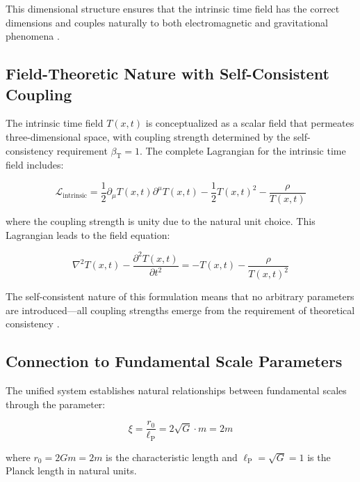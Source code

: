 \documentclass[12pt,a4paper]{article}
\newcommand{\Tfieldt}{T(x,t)}
\newcommand{\betaT}{\beta_{\text{T}}}
\newcommand{\lP}{\ell_{\text{P}}}
\newcommand{\xipar}{\xi}
\begin{document}
	This dimensional structure ensures that the intrinsic time field has the correct dimensions and couples naturally to both electromagnetic and gravitational phenomena \cite{pascher_lagrangian_2025}.
	
	\subsection{Field-Theoretic Nature with Self-Consistent Coupling}
	\label{subsec:field_theoretic_self_consistent}
	
	The intrinsic time field $\Tfieldt$ is conceptualized as a scalar field that permeates three-dimensional space, with coupling strength determined by the self-consistency requirement $\betaT = 1$. The complete Lagrangian for the intrinsic time field includes:
	
	\begin{equation}
		\mathcal{L}_{\text{intrinsic}} = \frac{1}{2} \partial_\mu \Tfieldt \partial^\mu \Tfieldt - \frac{1}{2}\Tfieldt^2 - \frac{\rho}{\Tfieldt}
	\end{equation}
	
	where the coupling strength is unity due to the natural unit choice. This Lagrangian leads to the field equation:
	
	\begin{equation}
		\nabla^2 \Tfieldt - \frac{\partial^2 \Tfieldt}{\partial t^2} = -\Tfieldt - \frac{\rho}{\Tfieldt^2}
	\end{equation}
	
	The self-consistent nature of this formulation means that no arbitrary parameters are introduced—all coupling strengths emerge from the requirement of theoretical consistency \cite{pascher_unified_2025}.
	
	\subsection{Connection to Fundamental Scale Parameters}
	\label{subsec:fundamental_scales}
	
	The unified system establishes natural relationships between fundamental scales through the parameter:
	
	\begin{equation}
		\xipar = \frac{r_0}{\lP} = 2\sqrt{G} \cdot m = 2m
	\end{equation}
	
	where $r_0 = 2Gm = 2m$ is the characteristic length and $\lP = \sqrt{G} = 1$ is the Planck length in natural units.
	
\end{document}
